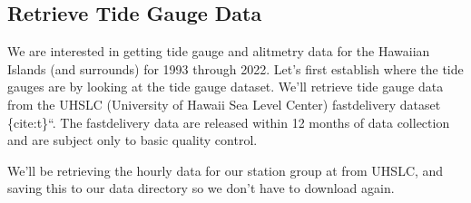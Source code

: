 \documentclass[letterpaper,10pt,english]{jupyterBook}
\begin{document}
\subsection{Retrieve Tide Gauge Data}
\label{\detokenize{notebooks/SL_Data_Wrangling:retrieve-tide-gauge-data}}
\sphinxAtStartPar
We are interested in getting tide gauge and alitmetry data for the Hawaiian Islands (and surrounds) for 1993 through 2022.
Let’s first establish where the tide gauges are by looking at the tide gauge dataset. We’ll retrieve tide gauge data from the UHSLC (University of Hawaii Sea Level Center) fast\sphinxhyphen{}delivery dataset \{cite:t\}``. The fast\sphinxhyphen{}delivery data are released within 1\sphinxhyphen{}2 months of data collection and are subject only to basic quality control.

\sphinxAtStartPar
We’ll be retrieving the hourly data for our station group at from UHSLC, and saving this to our data directory so we don’t have to download again.
\end{document}
